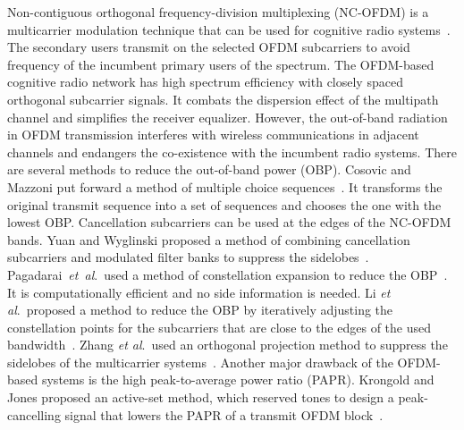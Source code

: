 \documentclass[paper]{ieice}
\begin{document}
Non-contiguous orthogonal frequency-division multiplexing (NC-OFDM) is a multicarrier modulation technique that can be used for cognitive radio systems~\cite{5783994,5669234,5497070}.  The secondary users transmit on the selected OFDM subcarriers to avoid frequency of the incumbent primary users of the spectrum.  The OFDM-based cognitive radio network has high spectrum efficiency with closely spaced orthogonal subcarrier signals.  It combats the dispersion effect of the multipath channel and simplifies the receiver equalizer.  However, the out-of-band radiation in OFDM transmission interferes with wireless communications in adjacent channels and endangers the co-existence with the incumbent radio systems.  There are several methods to reduce the out-of-band power (OBP).  Cosovic and Mazzoni put forward a method of multiple choice sequences~\cite{Supp_sidelobes_MCS}.  It transforms the original transmit sequence into a set of sequences and chooses the one with the lowest OBP.   Cancellation subcarriers can be used at the edges of the NC-OFDM bands.  Yuan and Wyglinski proposed a method of combining cancellation subcarriers and modulated filter banks to suppress the sidelobes~\cite{5424082}.  Pagadarai~\emph{et~al}.~used a method of constellation expansion to reduce the OBP~\cite{4489193}.  It is computationally efficient and no side information is needed.   Li \emph{et al}.~proposed a method to reduce the OBP by iteratively adjusting the constellation points for the subcarriers that are close to the edges of the used bandwidth~\cite{4939341}.  Zhang \emph{et al}.~used an orthogonal projection method to suppress the sidelobes of the multicarrier systems~\cite{6148126}. Another major drawback of the OFDM-based systems is the high peak-to-average power ratio (PAPR).  Krongold and Jones proposed an active-set method, which reserved tones to design a peak-cancelling signal that lowers the PAPR of a transmit OFDM block~\cite{krongold2004active}.  
\end{document}
